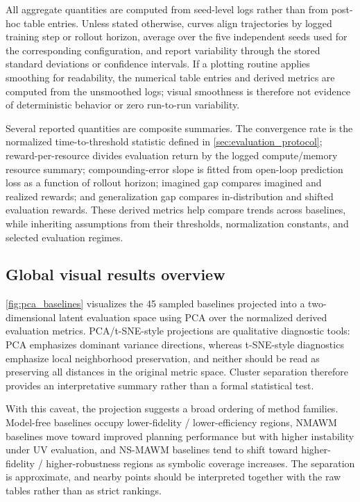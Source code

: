 \documentclass{article}
\theoremstyle{plain}
\theoremstyle{definition}
\theoremstyle{remark}
\begin{document}
All aggregate quantities are computed from seed-level logs rather than from post-hoc table entries. Unless stated otherwise, curves align trajectories by logged training step or rollout horizon, average over the five independent seeds used for the corresponding configuration, and report variability through the stored standard deviations or confidence intervals. If a plotting routine applies smoothing for readability, the numerical table entries and derived metrics are computed from the unsmoothed logs; visual smoothness is therefore not evidence of deterministic behavior or zero run-to-run variability.

Several reported quantities are composite summaries. The convergence rate is the normalized time-to-threshold statistic defined in \autoref{sec:evaluation_protocol}; reward-per-resource divides evaluation return by the logged compute/memory resource summary; compounding-error slope is fitted from open-loop prediction loss as a function of rollout horizon; imagined gap compares imagined and realized rewards; and generalization gap compares in-distribution and shifted evaluation rewards. These derived metrics help compare trends across baselines, while inheriting assumptions from their thresholds, normalization constants, and selected evaluation regimes.

\subsection{Global visual results overview}

\autoref{fig:pca_baselines} visualizes the 45 sampled baselines projected into a two-dimensional latent evaluation space using PCA over the normalized derived evaluation metrics. PCA/t-SNE-style projections are qualitative diagnostic tools: PCA emphasizes dominant variance directions, whereas t-SNE-style diagnostics emphasize local neighborhood preservation, and neither should be read as preserving all distances in the original metric space. Cluster separation therefore provides an interpretative summary rather than a formal statistical test.

With this caveat, the projection suggests a broad ordering of method families. Model-free baselines occupy lower-fidelity / lower-efficiency regions, NMAWM baselines move toward improved planning performance but with higher instability under UV evaluation, and NS-MAWM baselines tend to shift toward higher-fidelity / higher-robustness regions as symbolic coverage increases. The separation is approximate, and nearby points should be interpreted together with the raw tables rather than as strict rankings.
\end{document}
